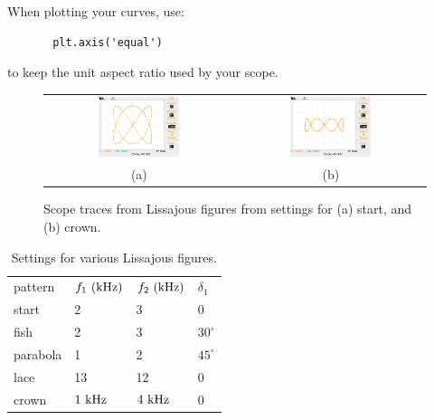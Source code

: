 When plotting your curves, use:
\begin{verbatim}
       plt.axis('equal')
\end{verbatim}
to keep the unit aspect ratio used by your scope.

\begin{figure}[htbp]
\begin{center}
\begin{tabular}{cc}
\includegraphics[width=0.45\textwidth]{figs/labs/lissajous/scope_lissajous.jpg} & 
\includegraphics[width=0.45\textwidth]{figs/labs/lissajous/scope_crown.jpg} \\
(a) & (b) \\
\end{tabular}
\caption{Scope traces from Lissajous figures from settings for (a) start, and (b) crown.}
\label{fig:tracelissajous}
\end{center}
\end{figure}

\begin{table}
\caption{Settings for various Lissajous figures.}
\begin{tabular}{llll}
pattern & $f_1~\rm(kHz)$ & $f_2~\rm(kHz)$ & $\delta_1$ \\
start & 2 & 3 & 0 \\
fish & 2 & 3 & $30^\circ$ \\
parabola & 1 & 2 & $45^\circ$ \\
lace & 13 & 12 & 0 \\
crown & $1~\rm kHz$ & $4~\rm kHz$ & 0 \\
\end{tabular}
\end{table}

